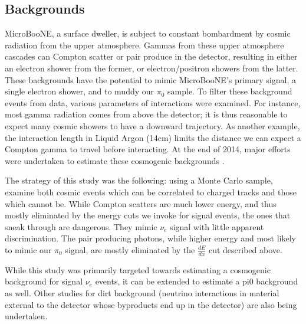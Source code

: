 \documentclass[12pt]{article}
\begin{document}
\subsection{Backgrounds}

 MicroBooNE, a surface dweller, is subject to constant bombardment by cosmic radiation from the upper atmosphere. Gammas from these upper atmosphere cascades can Compton scatter or pair produce in the detector, resulting in either an electron shower from the former, or electron/positron showers from the latter. These backgrounds have the potential to mimic MicroBooNE's primary signal, a single electron shower, and to muddy our $\pi_0$ sample.  To filter these background events from data, various parameters of interactions were examined. For instance, most gamma radiation comes from above the detector; it is thus reasonable to expect many cosmic showers to have a downward trajectory. As another example, the interaction length in Liquid Argon (14cm) limits the distance we can expect a Compton gamma to travel before interacting. At the end of 2014, major efforts were undertaken to estimate these cosmogenic backgrounds \cite{technote}.   
\par The strategy of this study was the following: using a Monte Carlo sample, examine both cosmic events which can be correlated to charged tracks and those which cannot be. While Compton scatters are much lower energy, and thus mostly eliminated by the energy cuts we invoke for signal events, the ones that sneak through are dangerous. They mimic $\nu_e$ signal with little apparent discrimination.  The pair producing photons, while higher energy and most likely to mimic our $\pi_0$ signal, are mostly eliminated by the $\frac{dE}{dx}$ cut described above. 
\par While this study was primarily targeted towards estimating a cosmogenic background for signal $\nu_e$ events, it can be extended to estimate a pi0 background as well. Other studies for dirt background (neutrino interactions in material external to the detector whose byproducts end up in the detector) are also being undertaken.  
\end{document}
